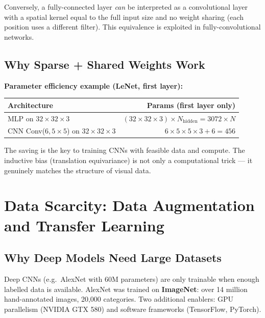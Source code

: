 \documentclass[11pt,a4paper]{article}
\begin{document}
Conversely, a fully-connected layer \emph{can} be interpreted as a convolutional layer with a spatial kernel equal to the full input size and no weight sharing (each position uses a different filter). This equivalence is exploited in fully-convolutional networks.

\subsection{Why Sparse + Shared Weights Work}

\begin{tcolorbox}[colback=LightBlue,colframe=AccentBlue,boxrule=0.8pt,arc=3pt]
\textbf{Parameter efficiency example (LeNet, first layer):}\\[4pt]
\begin{tabular}{@{}lr@{}}
\toprule
Architecture & Params (first layer only) \\
\midrule
MLP on $32\times32\times3$ & $(32\times32\times3)\times N_{\text{hidden}} = 3072\times N$ \\
CNN Conv($6, 5\times5$) on $32\times32\times3$ & $6\times5\times5\times3 + 6 = 456$ \\
\bottomrule
\end{tabular}
\end{tcolorbox}

The saving is the key to training CNNs with feasible data and compute. The inductive bias (translation equivariance) is not only a computational trick — it genuinely matches the structure of visual data.

\section{Data Scarcity: Data Augmentation and Transfer Learning}
\label{sec:data_scarcity}

\subsection{Why Deep Models Need Large Datasets}

Deep CNNs (e.g.\ AlexNet with 60M parameters) are only trainable when enough labelled data is available. AlexNet was trained on \textbf{ImageNet}: over 14 million hand-annotated images, 20,000 categories. Two additional enablers: GPU parallelism (NVIDIA GTX 580) and software frameworks (TensorFlow, PyTorch).
\end{document}
